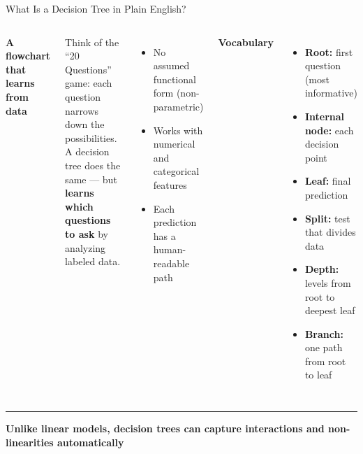 \documentclass[8pt,aspectratio=169]{beamer}
\newcommand{\bottomnote}[1]{%
\vfill
\vspace{-2mm}
\textcolor{mllavender2}{\rule{\textwidth}{0.4pt}}
\vspace{1mm}
\footnotesize
\textbf{#1}
}
\newenvironment{compactlist}{%
  \begin{itemize}%
    \setlength{\itemsep}{2pt}%
    \setlength{\parskip}{0pt}%
    \setlength{\parsep}{0pt}%
}{%
  \end{itemize}%
}
\newcommand{\highlight}[1]{\textcolor{mlorange}{\textbf{#1}}}
\begin{document}
\begin{frame}[t]{What Is a Decision Tree in Plain English?}
\begin{columns}[T]
\small
\textbf{A flowchart that learns from data}

\footnotesize
Think of the ``20 Questions'' game: each question narrows down the possibilities. A decision tree does the same --- but \highlight{learns which questions to ask} by analyzing labeled data.
\begin{compactlist}
\item \footnotesize No assumed functional form (non-parametric)
\item \footnotesize Works with numerical and categorical features
\item \footnotesize Each prediction has a human-readable path
\end{compactlist}

\vspace{2mm}
\footnotesize
\textbf{Vocabulary}
\begin{compactlist}
\item \footnotesize \textbf{Root:} first question (most informative)
\item \footnotesize \textbf{Internal node:} each decision point
\item \footnotesize \textbf{Leaf:} final prediction
\item \footnotesize \textbf{Split:} test that divides data
\item \footnotesize \textbf{Depth:} levels from root to deepest leaf
\item \footnotesize \textbf{Branch:} one path from root to leaf
\end{compactlist}
\end{columns}
\bottomnote{Unlike linear models, decision trees can capture interactions and non-linearities automatically}
\end{frame}
\end{document}
